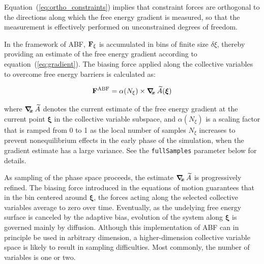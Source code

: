 Equation~(\ref{eq:ortho_constraints}) implies that constraint forces
are orthogonal to the directions along which the free energy gradient is
measured, so that the measurement is effectively performed on unconstrained
degrees of freedom.

In the framework of ABF,
${\bf F}_\xi$ is accumulated in bins of finite size $\delta \xi$,
thereby providing an estimate of the free energy gradient
according to equation~({\ref{eq:gradient}}).
The biasing force applied along the collective variables
to overcome free energy barriers is calculated as:

\begin{equation}
  \label{eq:abf}
  {\bf F}^{\rm ABF} = \alpha(N_\xi) \times \mbox{\boldmath$\nabla_{\!\!x}\,$} \widetilde A({\mbox{\boldmath{$\xi$}}})
\end{equation}

where $\mbox{\boldmath$\nabla_{\!\!x}\,$} \widetilde A$ denotes the current estimate of the
free energy gradient at the current point $\bm{\xi}$ in the collective
variable subspace, and $\alpha(N_\xi)$ is a scaling factor that is ramped
from 0 to 1 as the local number of samples $N_\xi$ increases
to prevent nonequilibrium effects in the early phase of the simulation,
when the gradient estimate has a large variance.
See the \texttt{fullSamples} parameter below for details.

As sampling of the phase space proceeds, the estimate
$\mbox{\boldmath$\nabla_{\!\!x}\,$} \widetilde A$ is progressively refined. The biasing
force introduced in the equations of motion guarantees that in
the bin centered around $\bm{\xi}$,
the forces acting along the selected collective variables average
to zero over time. Eventually, as the undelying free energy surface is canceled
by the adaptive bias, evolution of the system along $\bm{\xi}$
is governed mainly by diffusion.
Although this implementation of ABF can in principle be used in 
arbitrary dimension, a higher-dimension collective variable space is likely
to result in sampling difficulties.
Most commonly, the number of variables is one or two.



\label{sec:colvarbias_abf_req}

